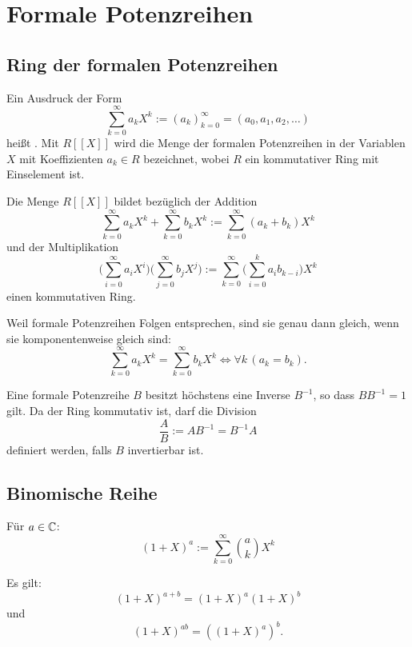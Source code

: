 \section{Formale Potenzreihen}
\subsection{Ring der formalen Potenzreihen}
\begin{definition}\mbox{}\newline
Ein Ausdruck der Form
\begin{equation}
\sum_{k=0}^\infty a_k X^k := (a_k)_{k=0}^\infty = (a_0,a_1,a_2,\ldots)
\end{equation}
heißt . Mit $R[[X]]$ wird die Menge
der formalen Potenzreihen in der Variablen $X$ mit Koeffizienten
$a_k\in R$ bezeichnet, wobei $R$ ein kommutativer Ring
mit Einselement ist.
\end{definition}
Die Menge $R[[X]]$ bildet bezüglich der Addition
\begin{equation}
\sum_{k=0}^\infty a_k X^k+\sum_{k=0}^\infty b_k X^k
:= \sum_{k=0}^\infty (a_k+b_k)X^k
\end{equation}
und der Multiplikation
\begin{equation}
\bigg(\sum_{i=0}^\infty a_i X^i\bigg)\bigg(\sum_{j=0}^\infty b_j X^j\bigg)
:= \sum_{k=0}^\infty \bigg(\sum_{i=0}^{k} a_ib_{k-i}\bigg)X^k
\end{equation}
einen kommutativen Ring.

 Weil formale Potenzreihen
Folgen entsprechen, sind sie genau dann gleich, wenn sie
komponentenweise gleich sind:
\begin{equation}
\sum_{k=0}^\infty a_k X^k = \sum_{k=0}^\infty b_k X^k
\iff \forall k\,(a_k=b_k).
\end{equation}

Eine formale Potenzreihe $B$ besitzt höchstens eine Inverse $B^{-1}$,
so dass $BB^{-1}=1$ gilt. Da der Ring kommutativ ist, darf die
Division
\begin{equation}
\frac{A}{B} := AB^{-1} = B^{-1}A
\end{equation}
definiert werden, falls $B$ invertierbar ist.

\subsection{Binomische Reihe}
\begin{definition}\mbox{}\newline
Für $a\in\mathbb C$:
\begin{equation}
(1+X)^a := \sum_{k=0}^\infty \binom{a}{k} X^k
\end{equation}
\end{definition}
\noindent
Es gilt:
\begin{equation}
(1+X)^{a+b} = (1+X)^a (1+X)^b 
\end{equation}
und
\begin{equation}
(1+X)^{ab} = ((1+X)^a)^b.
\end{equation}
